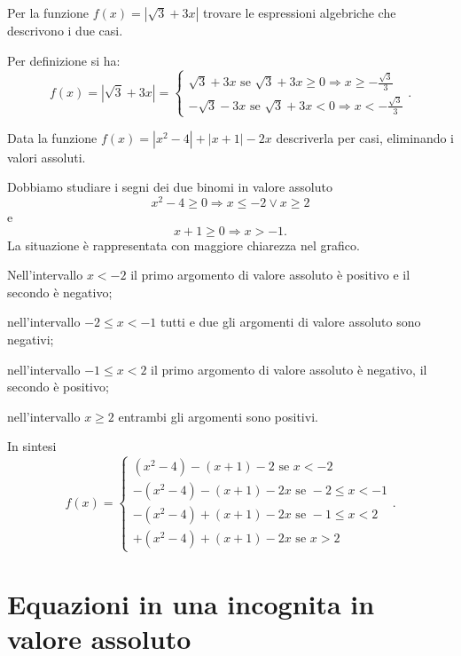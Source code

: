 \begin{exrig}
\begin{esempio}
Per la funzione $f(x)=\left|\sqrt 3+3x\right|$ trovare le espressioni algebriche che descrivono i due casi.

Per definizione si ha: 
\[f(x)=\left|\sqrt 3+3x\right|=\left\{\begin{array}{l}{\sqrt 3+3x \text{ se }\sqrt 3+3x\ge 0\Rightarrow x\ge -\frac{\sqrt 3} 3}\\{-\sqrt 3-3x\text{ se }\sqrt 3+3x<0\Rightarrow x<-\frac{\sqrt 3} 3}\end{array}\right..\]
\end{esempio}

\begin{esempio}
Data la funzione $f(x)=\left|x^2-4\right|+\left|x+1\right|-2x$ descriverla per casi, eliminando i valori assoluti.

Dobbiamo studiare i segni dei due binomi in valore assoluto 
\[x^2-4\ge 0\Rightarrow x\le -2\vee x\ge 2\] e \[x+1\ge 0\Rightarrow x>-1.\] 
La situazione è rappresentata con maggiore chiarezza nel grafico.
\begin{center}

\end{center}

\begin{itemize*}
\item Nell'intervallo $x<-2$ il primo argomento di valore assoluto è positivo e il secondo è negativo;
\item nell'intervallo $-2\le x<-1$ tutti e due gli argomenti di valore assoluto sono negativi;
\item nell'intervallo $-1\le x<2$ il primo argomento di valore assoluto è negativo, il secondo è positivo;
\item nell'intervallo $x\ge 2$ entrambi gli argomenti sono positivi.
\end{itemize*}
In sintesi 
\[f(x)=\left\{\begin{array}{l}(x^2-4)-(x+1)-2\text{ se }x<-2 \\-(x^2-4)-(x+1)-2x\text{ se }-2\le x<-1 \\-(x^2-4)+(x+1)-2x\text{ se }-1\le x<2 \\+(x^2-4)+(x+1)-2x\text{ se }x>2 \end{array}\right..\]
\end{esempio}
\end{exrig}

\section{Equazioni in una incognita in valore assoluto}
